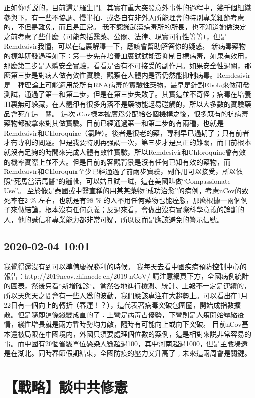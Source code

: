 \documentclass[twocolumn]{ctexart}
\begin{document}
正如你所説的，目前這是羅生門。其實在重大突發意外事件的過程中，幾千個組織參與下，有一些不協調、慢半拍、或各自有非外人所能理會的特別專業細節考慮的，不但是難免，而且是正常。
我不認識武漢病毒所的所長，也不知道她做決定之前考慮了些什麽（可能包括醫藥、公關、法律、現實可行性等等），但是Remdesivir我懂，可以在這裏解釋一下，應該會幫助解答你的疑惑。
新病毒藥物的標準研發過程如下：第一步先在培養皿裏試試能否抑制目標病毒，如果有效用，那麽第二步是人體安全實驗，看看是否有不可接受的副作用。如果安全性過關，那麽第三步是對病人做有效性實驗，觀察在人體内是否仍然能抑制病毒。Remdesivir是一種理論上可能適用於所有RNA病毒的實驗性藥物，最早是針對Ebola來做研發測試，通過了第一和第二步，但是在第三步失敗了。其實這並不奇怪；病毒在培養皿裏無可躲藏，在人體卻有很多角落不是藥物能輕易碰觸的，所以大多數的實驗藥品會死在這一關。
這次nCov樣本被廣爲分配給各個機構之後，很多既有的抗病毒藥物都被拿來對其做實驗。目前已經通過第一和第二步的有兩種，也就是Remdesivir和Chloroquine（氯喹）。後者是很老的藥，專利早已過期了；只有前者才有專利的問題。但是我要特別再强調一次，第三步才是真正的難關，而目前根本就沒有足夠的時間來完成人體有效性實驗，所以Remdesivir和Chloroquine會有效的機率實際上並不大。但是目前的客觀背景是沒有任何已知有效的藥物，而Remdesivir和Chloroquin至少已經通過了前兩步實驗，副作用可以接受，所以依照“死馬當活馬醫”的邏輯，可以姑且試一試，這在美國叫做“Compassionate Use”。
至於像是泰國或中醫宣稱的用某某藥物“成功治愈”的病例，考慮nCov的致死率在2 \% 左右，也就是有98 \% 的人不用任何藥物也能痊愈，那麽根據一兩個例子來做結論，根本沒有任何意義；反過來看，會做出沒有實際科學意義的論斷的人，他的誠信和專業能力都非常可疑，所以反而是應該避免的警示信號。
\subsection*{2020-02-04 10:01}

我覺得還沒有到可以準備慶祝勝利的時候。
我每天去看中國疾病預防控制中心的報告：http://2019ncov.chinacdc.cn/2019-nCoV/
請注意網頁下方，全國病例統計的圖表，然後只看“新增確診”。當然各地進行檢測、統計、上報不一定是連續的，所以天與天之間會有一些人爲的波動，我們應該專注在大趨勢上。可以看出在1月22日有一個向上的轉折（春運！？），這代表著病毒突破包圍圈，開始成指數擴散。但是隨即這條綫變成直的了：上彎是病毒占優勢，下彎則是人類開始壓縮疫情，綫性增長就是兩方暫時勢均力敵，隨時有可能向上或向下突破。
目前nCov基本還被局限在中國境内，外國只須要處理個位數的案例，這是相對來説非常容易的事。而中國有20個省級單位感染人數超過100，其中河南超過1000，但是主戰場還是在湖北。同時春節假期結束，全國防疫的壓力又升高了；未來這兩周會是關鍵。
\section*{【戰略】談中共修憲}
\end{document}
